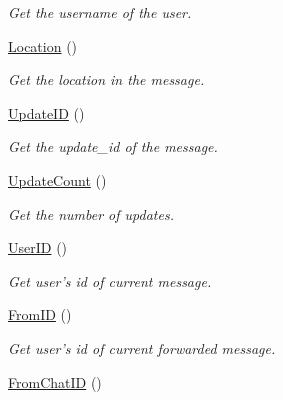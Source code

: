 \begin{DoxyCompactItemize}
\begin{DoxyCompactList}\small\item\em \-Get the username of the user. \end{DoxyCompactList}\item 
\hypertarget{class_telegram_aae456ae24175445c9c797b0d58d5716b}{\hyperlink{class_telegram_aae456ae24175445c9c797b0d58d5716b}{\-Location} ()}\label{class_telegram_aae456ae24175445c9c797b0d58d5716b}

\begin{DoxyCompactList}\small\item\em \-Get the location in the message. \end{DoxyCompactList}\item 
\hypertarget{class_telegram_a596f610d501cd48e6c20ec65dd9c3b34}{\hyperlink{class_telegram_a596f610d501cd48e6c20ec65dd9c3b34}{\-Update\-I\-D} ()}\label{class_telegram_a596f610d501cd48e6c20ec65dd9c3b34}

\begin{DoxyCompactList}\small\item\em \-Get the update\-\_\-id of the message. \end{DoxyCompactList}\item 
\hypertarget{class_telegram_a330b2888bb21d6c182534021a797103b}{\hyperlink{class_telegram_a330b2888bb21d6c182534021a797103b}{\-Update\-Count} ()}\label{class_telegram_a330b2888bb21d6c182534021a797103b}

\begin{DoxyCompactList}\small\item\em \-Get the number of updates. \end{DoxyCompactList}\item 
\hypertarget{class_telegram_afb1da9eb82ceca0b78cbba8e35e3fec8}{\hyperlink{class_telegram_afb1da9eb82ceca0b78cbba8e35e3fec8}{\-User\-I\-D} ()}\label{class_telegram_afb1da9eb82ceca0b78cbba8e35e3fec8}

\begin{DoxyCompactList}\small\item\em \-Get user's id of current message. \end{DoxyCompactList}\item 
\hypertarget{class_telegram_af9d816f01fd16f3ace634023f8320aad}{\hyperlink{class_telegram_af9d816f01fd16f3ace634023f8320aad}{\-From\-I\-D} ()}\label{class_telegram_af9d816f01fd16f3ace634023f8320aad}

\begin{DoxyCompactList}\small\item\em \-Get user's id of current forwarded message. \end{DoxyCompactList}\item 
\hypertarget{class_telegram_a4974bfd879b102b7bff6b69e14673b56}{\hyperlink{class_telegram_a4974bfd879b102b7bff6b69e14673b56}{\-From\-Chat\-I\-D} ()}\label{class_telegram_a4974bfd879b102b7bff6b69e14673b56}


\end{DoxyCompactItemize}
